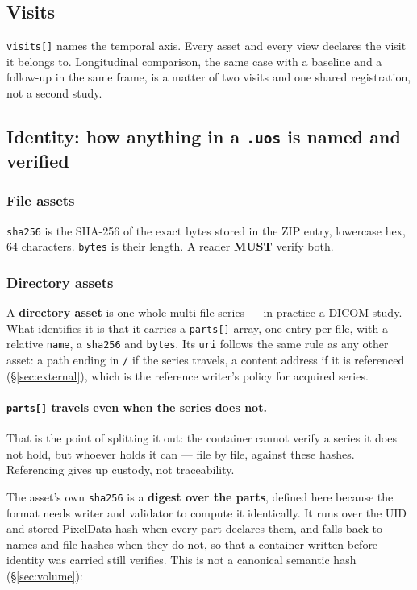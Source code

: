\documentclass[11pt,a4paper]{article}
\newcommand{\MUST}{\textcolor{uosred}{\textbf{MUST}}}
\newcommand{\code}[1]{\texttt{\small #1}}
\begin{document}
\subsection{Visits}

\code{visits[]} names the temporal axis. Every asset and every view declares the visit it
belongs to. Longitudinal comparison, the same case with a baseline and a follow-up in
the same frame, is a matter of two visits and one shared registration, not a second
study.

\subsection{Identity: how anything in a \code{.uos} is named and verified}\label{sec:identity}

\subsubsection{File assets}
\code{sha256} is the SHA-256 of the exact bytes stored in the ZIP entry, lowercase hex,
64 characters. \code{bytes} is their length. A reader \MUST{} verify both.

\subsubsection{Directory assets}\label{sec:dirasset}
A \textbf{directory asset} is one whole multi-file series --- in practice a DICOM study.
What identifies it is that it carries a \code{parts[]} array, one entry per file, with a
relative \code{name}, a \code{sha256} and \code{bytes}. Its \code{uri} follows the same
rule as any other asset: a path ending in \code{/} if the series travels, a content address
if it is referenced (\S\ref{sec:external}), which is the reference writer's policy for acquired series.

\paragraph{\code{parts[]} travels even when the series does not.} That is the point of
splitting it out: the container cannot verify a series it does not hold, but whoever holds
it can --- file by file, against these hashes. Referencing gives up custody, not
traceability.

\vspace{6px}
The asset's own \code{sha256} is a \textbf{digest over the parts}, defined here because
the format needs writer and validator to compute it identically. It runs over
the UID and stored-PixelData hash when every part declares them, and falls back to names and file
hashes when they do not, so that a container written before identity was carried still
verifies. This is not a canonical semantic hash (\S\ref{sec:volume}):
\end{document}
